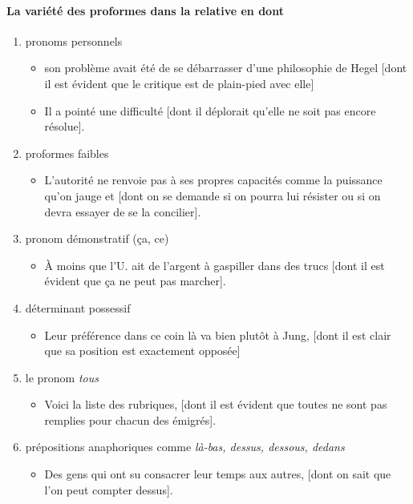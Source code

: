 \documentclass[UTF8]{report}
\begin{document}
\paragraph{La variété des proformes dans la relative en dont}
\begin{enumerate}
    \item pronoms personnels
    \begin{itemize}
        \item son problème avait été de se débarrasser d’une philosophie de Hegel [dont il est évident que le critique est de plain-pied avec elle] 
        \item Il a pointé une difficulté [dont il déplorait qu’elle ne soit pas encore résolue].
    \end{itemize}
    \item proformes faibles
    \begin{itemize}
        \item L’autorité ne renvoie pas à ses propres capacités comme la puissance qu’on jauge et [dont on se demande si on pourra lui résister ou si on devra essayer de se la concilier].
    \end{itemize}
    \item pronom démonstratif (ça, ce)
    \begin{itemize}
        \item À moins que l’U. ait de l’argent à gaspiller dans des trucs [dont il est évident que ça ne peut pas marcher].
    \end{itemize}
    \item déterminant possessif
    \begin{itemize}
        \item Leur préférence dans ce coin là va bien plutôt à Jung, [dont il est clair que sa position est exactement opposée]
    \end{itemize}
    \item le pronom \textit{tous}
    \begin{itemize}
        \item Voici la liste des rubriques, [dont il est évident que toutes ne sont pas remplies pour chacun des émigrés].
    \end{itemize}
    \item prépositions anaphoriques comme \textit{là-bas, dessus, dessous, dedans}
    \begin{itemize}
        \item Des gens qui ont su consacrer leur temps aux autres, [dont on sait que l’on peut compter dessus].
    \end{itemize}
\end{enumerate}
\end{document}
